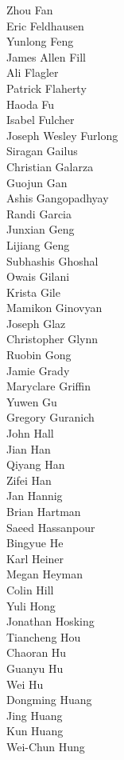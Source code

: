 Zhou Fan\\
Eric Feldhausen\\
Yunlong Feng\\
James Allen Fill\\
Ali Flagler\\
Patrick Flaherty\\
Haoda Fu\\
Isabel Fulcher\\
Joseph Wesley Furlong\\
Siragan Gailus\\
Christian Galarza\\
Guojun Gan\\
Ashis Gangopadhyay\\
Randi Garcia\\
Junxian Geng\\
Lijiang Geng\\
Subhashis Ghoshal\\
Owais Gilani\\
Krista Gile\\
Mamikon Ginovyan\\
Joseph Glaz\\
Christopher Glynn\\
Ruobin Gong\\
Jamie Grady\\
Maryclare Griffin\\
Yuwen Gu\\
Gregory Guranich\\
John Hall\\
Jian Han\\
Qiyang Han\\
Zifei Han\\
Jan Hannig\\
Brian Hartman\\
Saeed Hassanpour\\
Bingyue He\\
Karl Heiner\\
Megan Heyman\\
Colin Hill\\
Yuli Hong\\
Jonathan Hosking\\
Tiancheng Hou\\
Chaoran Hu\\
Guanyu Hu\\
Wei Hu\\
Dongming Huang\\
Jing Huang\\
Kun Huang\\
Wei-Chun Hung\\
